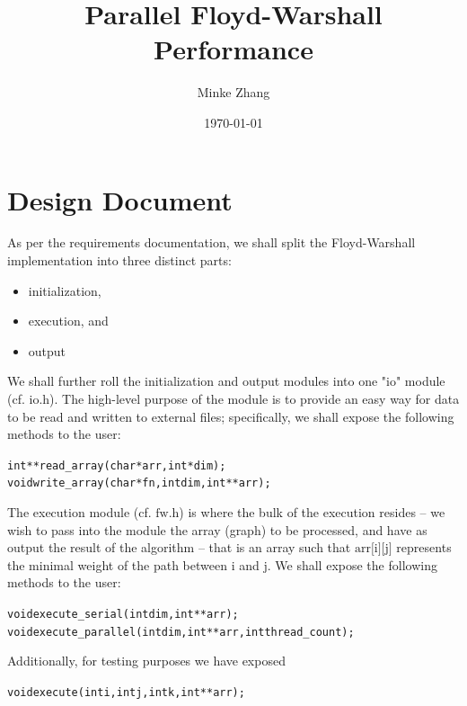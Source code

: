 \documentclass{article}
\newcommand{\tb}[1]{\textbf{#1}}
\newcommand{\cpart}[1]{\newblock{\LARGE {\\\\#1}}}
\newcommand{\code}[1]{\texttt{$\text{#1}$}}
\begin{document}

\title{\tb{Parallel Floyd-Warshall Performance}}
\author{Minke Zhang\hspace*{-\tabcolsep}}
\date{\today}

\begingroup
\let\center\flushright
\let\endcenter\endflushright
\maketitle
\endgroup

\section{Design Document}
\cpart{Modules}

As per the requirements documentation, we shall split the Floyd-Warshall implementation into three distinct parts:

	\begin{itemize}
		\item initialization,
		\item execution, and
		\item output
	\end{itemize}

We shall further roll the initialization and output modules into one "io" module (cf. \code{io.h}). The high-level purpose of the module is to provide an easy way 
for data to be read and written to external files; specifically, we shall expose the following methods to the user:

\begin{alltt}
int **read_array(char *arr, int *dim);
void write_array(char *fn, int dim, int **arr);
\end{alltt}

The execution module (cf. \code{fw.h}) is where the bulk of the execution resides -- we wish to pass into the module the array (graph) to be processed, and have as 
output the result of the algorithm -- that is an array such that \code{arr[i][j]} represents the minimal weight of the path between \code{i} and \code{j}. We shall 
expose the following methods to the user:

\begin{alltt}
void execute_serial(int dim, int **arr);
void execute_parallel(int dim, int **arr, int thread_count);
\end{alltt}

Additionally, for testing purposes we have exposed

\begin{alltt}
void execute(int i, int j, int k, int **arr);
\end{alltt}
\end{document}
